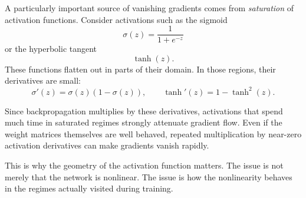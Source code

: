 A particularly important source of vanishing gradients comes from \emph{saturation} of activation functions.
Consider activations such as the sigmoid
\[
\sigma(z)=\frac{1}{1+e^{-z}}
\]
or the hyperbolic tangent
\[
\tanh(z).
\]
These functions flatten out in parts of their domain.
In those regions, their derivatives are small:
\[
\sigma'(z)=\sigma(z)(1-\sigma(z)),
\qquad
\tanh'(z)=1-\tanh^2(z).
\]

\medskip

Since backpropagation multiplies by these derivatives, activations that spend much time in saturated regimes strongly attenuate gradient flow.
Even if the weight matrices themselves are well behaved, repeated multiplication by near-zero activation derivatives can make gradients vanish rapidly.

\medskip

This is why the geometry of the activation function matters.
The issue is not merely that the network is nonlinear.
The issue is how the nonlinearity behaves in the regimes actually visited during training.


